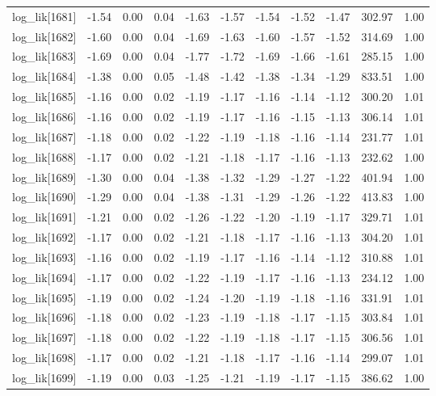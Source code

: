 \begin{table}[ht]
\begin{tabular}{rrrrrrrrrrr}
  log\_lik[1681] & -1.54 & 0.00 & 0.04 & -1.63 & -1.57 & -1.54 & -1.52 & -1.47 & 302.97 & 1.00 \\ 
  log\_lik[1682] & -1.60 & 0.00 & 0.04 & -1.69 & -1.63 & -1.60 & -1.57 & -1.52 & 314.69 & 1.00 \\ 
  log\_lik[1683] & -1.69 & 0.00 & 0.04 & -1.77 & -1.72 & -1.69 & -1.66 & -1.61 & 285.15 & 1.00 \\ 
  log\_lik[1684] & -1.38 & 0.00 & 0.05 & -1.48 & -1.42 & -1.38 & -1.34 & -1.29 & 833.51 & 1.00 \\ 
  log\_lik[1685] & -1.16 & 0.00 & 0.02 & -1.19 & -1.17 & -1.16 & -1.14 & -1.12 & 300.20 & 1.01 \\ 
  log\_lik[1686] & -1.16 & 0.00 & 0.02 & -1.19 & -1.17 & -1.16 & -1.15 & -1.13 & 306.14 & 1.01 \\ 
  log\_lik[1687] & -1.18 & 0.00 & 0.02 & -1.22 & -1.19 & -1.18 & -1.16 & -1.14 & 231.77 & 1.01 \\ 
  log\_lik[1688] & -1.17 & 0.00 & 0.02 & -1.21 & -1.18 & -1.17 & -1.16 & -1.13 & 232.62 & 1.00 \\ 
  log\_lik[1689] & -1.30 & 0.00 & 0.04 & -1.38 & -1.32 & -1.29 & -1.27 & -1.22 & 401.94 & 1.00 \\ 
  log\_lik[1690] & -1.29 & 0.00 & 0.04 & -1.38 & -1.31 & -1.29 & -1.26 & -1.22 & 413.83 & 1.00 \\ 
  log\_lik[1691] & -1.21 & 0.00 & 0.02 & -1.26 & -1.22 & -1.20 & -1.19 & -1.17 & 329.71 & 1.01 \\ 
  log\_lik[1692] & -1.17 & 0.00 & 0.02 & -1.21 & -1.18 & -1.17 & -1.16 & -1.13 & 304.20 & 1.01 \\ 
  log\_lik[1693] & -1.16 & 0.00 & 0.02 & -1.19 & -1.17 & -1.16 & -1.14 & -1.12 & 310.88 & 1.01 \\ 
  log\_lik[1694] & -1.17 & 0.00 & 0.02 & -1.22 & -1.19 & -1.17 & -1.16 & -1.13 & 234.12 & 1.00 \\ 
  log\_lik[1695] & -1.19 & 0.00 & 0.02 & -1.24 & -1.20 & -1.19 & -1.18 & -1.16 & 331.91 & 1.01 \\ 
  log\_lik[1696] & -1.18 & 0.00 & 0.02 & -1.23 & -1.19 & -1.18 & -1.17 & -1.15 & 303.84 & 1.01 \\ 
  log\_lik[1697] & -1.18 & 0.00 & 0.02 & -1.22 & -1.19 & -1.18 & -1.17 & -1.15 & 306.56 & 1.01 \\ 
  log\_lik[1698] & -1.17 & 0.00 & 0.02 & -1.21 & -1.18 & -1.17 & -1.16 & -1.14 & 299.07 & 1.01 \\ 
  log\_lik[1699] & -1.19 & 0.00 & 0.03 & -1.25 & -1.21 & -1.19 & -1.17 & -1.15 & 386.62 & 1.00 \\ 

\end{tabular}
\end{table}
